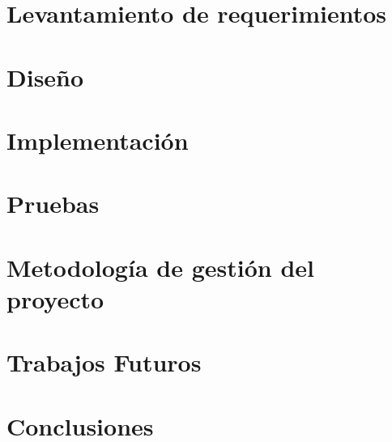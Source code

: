 \documentclass[letterpaper, 11pt, oneside]{book}
\begin{document}
\chapter{Levantamiento de requerimientos}
\label{chap:requerimientos}


\chapter{Diseño}
\label{chap:diseno}


\chapter{Implementación}
\label{chap:implementacion}


\chapter{Pruebas}
\label{chap:pruebas}


\chapter{Metodología de gestión del proyecto}
\label{chap:gestion}


\chapter{Trabajos Futuros}


\chapter{Conclusiones}


%
\end{document}
